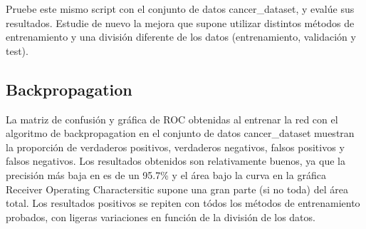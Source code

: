 \documentclass[a4paper, 12pt]{article}
\begin{document}
            Pruebe este mismo script con el conjunto de datos cancer\_dataset, y evalúe sus resultados. Estudie de nuevo la mejora que supone utilizar distintos métodos de entrenamiento y una división diferente de los datos (entrenamiento, validación y test).

            \newpage
            \subsection{Backpropagation}
                La matriz de confusión y gráfica de ROC obtenidas al entrenar la red con el algoritmo de backpropagation en el conjunto de datos cancer\_dataset muestran la proporción de verdaderos positivos, verdaderos negativos, falsos positivos y falsos negativos. Los resultados obtenidos son relativamente buenos, ya que la precisión más baja en es de un 95.7\% y el área bajo la curva en la gráfica Receiver Operating Charactersitic supone una gran parte (si no toda) del área total. Los resultados positivos se repiten con tódos los métodos de entrenamiento probados, con ligeras variaciones en función de la división de los datos.
\end{document}
